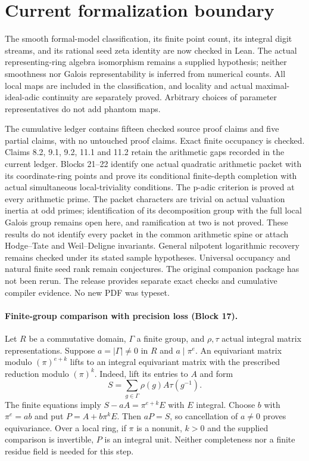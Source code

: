 \documentclass[11pt]{article}
\theoremstyle{definition}
\theoremstyle{remark}
\begin{document}
\section*{Current formalization boundary}
The smooth formal-model classification, its finite point count, its integral digit streams, and its rational seed zeta identity are now checked in Lean. The actual representing-ring algebra isomorphism remains a supplied hypothesis; neither smoothness nor Galois representability is inferred from numerical counts. All local maps are included in the classification, and locality and actual maximal-ideal-adic continuity are separately proved. Arbitrary choices of parameter representatives do not add phantom maps.

The cumulative ledger contains fifteen checked source proof claims and five partial claims, with no untouched proof claims. Exact finite occupancy is checked. Claims 8.2, 9.1, 9.2, 11.1 and 11.2 retain the arithmetic gaps recorded in the current ledger. Blocks 21--22 identify one actual quadratic arithmetic packet with its coordinate-ring points and prove its conditional finite-depth completion with actual simultaneous local-triviality conditions. The p-adic criterion is proved at every arithmetic prime. The packet characters are trivial on actual valuation inertia at odd primes; identification of its decomposition group with the full local Galois group remains open here, and ramification at two is not proved. These results do not identify every packet in the common arithmetic spine or attach Hodge--Tate and Weil--Deligne invariants. General nilpotent logarithmic recovery remains checked under its stated sample hypotheses. Universal occupancy and natural finite seed rank remain conjectures. The original companion package has not been rerun. The release provides separate exact checks and cumulative compiler evidence. No new PDF was typeset.


\paragraph{Finite-group comparison with precision loss (Block 17).}
Let $R$ be a commutative domain, $\Gamma$ a finite group, and $\rho,\tau$
actual integral matrix representations. Suppose $a=|\Gamma|\ne0$ in $R$ and
$a\mid\pi^e$. An equivariant matrix modulo $(\pi)^{e+k}$ lifts to an
integral equivariant matrix with the prescribed reduction modulo $(\pi)^k$.
Indeed, lift its entries to $A$ and form
\[
S=\sum_{g\in\Gamma}\rho(g)A\tau(g^{-1}).
\]
The finite equations imply $S-aA=\pi^{e+k}E$ with $E$ integral. Choose $b$
with $\pi^e=ab$ and put $P=A+b\pi^kE$. Then $aP=S$, so cancellation of
$a\ne0$ proves equivariance. Over a local ring, if $\pi$ is a nonunit,
$k>0$ and the supplied comparison is invertible, $P$ is an integral unit.
Neither completeness nor a finite residue field is needed for this step.
\end{document}
